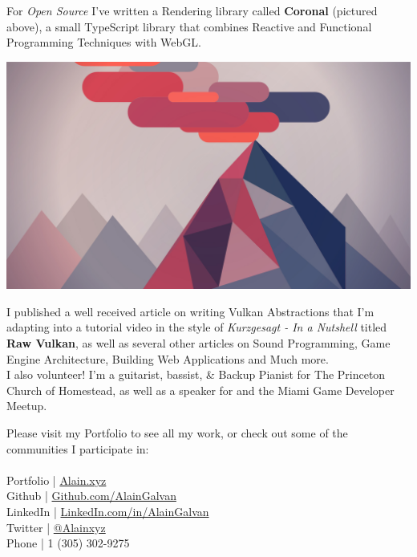 \documentclass[10pt,a4paper]{article}
\begin{document}
\begin{multicols}{2}
For \textit{Open Source} I've written a  Rendering library called \textbf{Coronal} (pictured above), a small TypeScript library that combines Reactive and Functional Programming Techniques with WebGL. 



\vspace{1.3em}

\noindent \includegraphics[width=\linewidth]{../portfolio/blog/raw-vulkan/assets/cover.jpg}


\vspace{1.3em}

I published a well received article on writing Vulkan Abstractions that I'm adapting into a tutorial video in the style of \textit{Kurzgesagt - In a Nutshell} titled \textbf{Raw Vulkan}, as well as several other articles on Sound Programming, Game Engine Architecture, Building Web Applications and Much more. \\

I also volunteer! I'm a guitarist, bassist, \& Backup Pianist for The Princeton Church of Homestead, as well as a speaker for  and the Miami Game Developer Meetup. 


Please visit my Portfolio to see all my work, or check out some of the communities I participate in: \\ \\
\noindent
\noindent \bull Portfolio | \href{https://alain.xyz}{Alain.xyz} \\
\bull Github | \href{https://github.com/alaingalvan}{Github.com/AlainGalvan} \\
\bull LinkedIn | \href{https://linkedin.com/in/alaingalvan}{LinkedIn.com/in/AlainGalvan} \\
\bull Twitter | \href{https://twitter.com/alainxyz}{@Alainxyz} \\
\bull Phone | \textsmaller{+}1 (305) 302-9275

\end{multicols}
\end{document}
